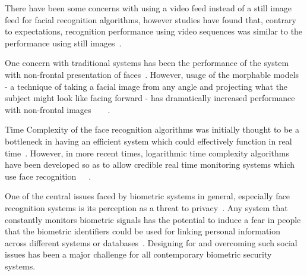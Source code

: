 \documentclass[10pt,twocolumn,pdftex]{article}
\begin{document}
There have been some concerns with using a video feed instead of a still image feed for facial recognition algorithms, however studies have found that, contrary to expectations, recognition performance using video sequences was similar to the performance using still images~\cite{frvt02}.

One concern with traditional systems has been the performance of the system with non-frontal presentation of faces~\cite{blanz05}. However, usage of the morphable models - a technique of taking a facial image from any angle and projecting what the subject might look like facing forward - has dramatically increased performance with non-frontal images~\cite{vbtv99}~\cite{pp09}~\cite{rg11}~\cite{ps13}.

Time Complexity of the face recognition algorithms was initially thought to be a bottleneck in having an efficient system which could effectively function in real time~\cite{aspi92}. However, in more recent times, logarithmic time complexity algorithms have been developed so as to allow credible real time monitoring systems which use face recognition~\cite{wmbXX}~\cite{rnd14}~\cite{ami13}.

One of the central issues faced by biometric systems in general, especially face recognition systems is its perception as a threat to privacy~\cite{delac04}. Any system that constantly monitors biometric signals has the potential to induce a fear in people that the biometric identifiers could be used for linking personal information across different systems or databases~\cite{jain04}. Designing for and overcoming such social issues has been a major challenge for all contemporary biometric security systems.



\end{document}
